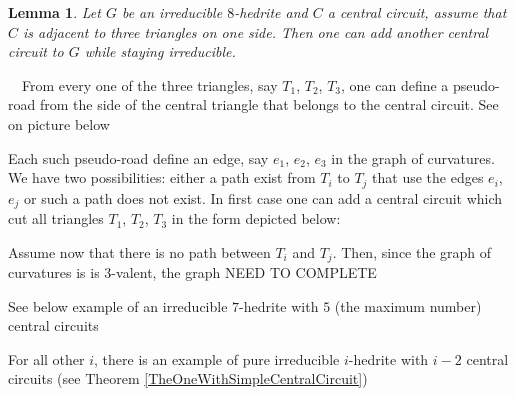 \documentclass[12pt]{article}
\newtheorem{lemma}{Lemma}
\newcommand{\proof}{\noindent{\bf Proof.}\ \ }
\begin{document}
\begin{center}
\epsfxsize=60mm
\end{center}



\begin{lemma}
Let $G$ be an irreducible $8$-hedrite and $C$ a central circuit, assume that $C$ is adjacent to three triangles on one side. Then one can add another central circuit to $G$ while staying irreducible.
\end{lemma}
\proof From every one of the three triangles, say $T_1$, $T_2$, $T_3$, one can define a pseudo-road from the side of the central triangle that belongs to the central circuit. See on picture below
\begin{center}
\epsfxsize=40mm
\end{center}
Each such pseudo-road define an edge, say $e_1$, $e_2$, $e_3$ in the graph 
of curvatures. We have two possibilities: either a path exist from $T_i$ 
to $T_j$ that use the edges $e_i$, $e_j$ or such a path does not exist. In 
first case one can add a central circuit which cut all triangles $T_1$, 
$T_2$, $T_3$ in the form depicted below:
\begin{center}
\epsfxsize=40mm
\end{center}

Assume now that there is no path between $T_i$ and $T_j$. Then, since the graph of curvatures is is $3$-valent, the graph NEED TO COMPLETE













See below example of an irreducible $7$-hedrite with $5$ (the maximum number) central circuits

\begin{center}
\epsfxsize=60mm
\end{center}

For all other $i$, there is an example of pure irreducible $i$-hedrite with $i-2$ central circuits (see Theorem \ref{TheOneWithSimpleCentralCircuit})
\end{document}
